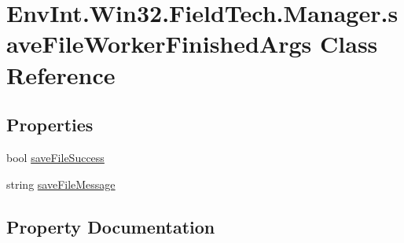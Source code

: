 \hypertarget{class_env_int_1_1_win32_1_1_field_tech_1_1_manager_1_1save_file_worker_finished_args}{}\section{Env\+Int.\+Win32.\+Field\+Tech.\+Manager.\+save\+File\+Worker\+Finished\+Args Class Reference}
\label{class_env_int_1_1_win32_1_1_field_tech_1_1_manager_1_1save_file_worker_finished_args}
\subsection*{Properties}
\begin{DoxyCompactItemize}
\item 
bool \hyperlink{class_env_int_1_1_win32_1_1_field_tech_1_1_manager_1_1save_file_worker_finished_args_ade86526171d5c37ef07dfd25e9667f2e}{save\+File\+Success}
\item 
string \hyperlink{class_env_int_1_1_win32_1_1_field_tech_1_1_manager_1_1save_file_worker_finished_args_af0c433cc77cfaee8e4c58687e70869e5}{save\+File\+Message}
\end{DoxyCompactItemize}


\subsection{Property Documentation}
\hypertarget{class_env_int_1_1_win32_1_1_field_tech_1_1_manager_1_1save_file_worker_finished_args_af0c433cc77cfaee8e4c58687e70869e5}{}
